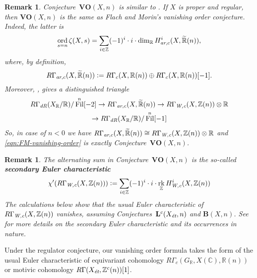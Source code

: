\documentclass[10pt,a4paper,oneside,draft]{article}
\DeclareMathOperator{\Fil}{Fil}
\DeclareMathOperator{\ord}{ord}
\DeclareMathOperator{\rk}{rk}
\newcommand{\CC}{\mathbb{C}}
\newcommand{\RR}{\mathbb{R}}
\newcommand{\ZZ}{\mathbb{Z}}
\newcommand{\ar}{\text{\it ar}}
\newcommand{\dR}{\text{\it dR}}
\newcommand{\et}{\text{\it \'{e}t}}
\newcommand{\Wc}{\text{\it W,c}}
\newcommand{\dfn}{\mathrel{\mathop:}=}
\theoremstyle{myplain}
\theoremstyle{mydefinition}
\newtheorem{remark}[theorem]{Remark}
\numberwithin{equation}{section}
\begin{document}
\begin{remark}
  Conjecture~$\mathbf{VO} (X,n)$ is similar to
  \cite[Conjecture~5.11]{Flach-Morin-2018}. If $X$ is proper and regular, then
  $\mathbf{VO} (X,n)$ is the same as Flach and Morin's vanishing order
  conjecture. Indeed, the latter is
  \begin{equation}
    \label{eqn:FM-vanishing-order}
    \ord_{s = n} \zeta (X,s) =
    \sum_{i\in \ZZ} (-1)^i \cdot i \cdot \dim_\RR H^i_{\ar,c} (X, \widetilde{\RR}(n)),
  \end{equation}
  where, by definition,
  \[ R\Gamma_{\ar,c} (X, \widetilde{\RR}(n)) \dfn
    R\Gamma_c (X, \RR(n)) \oplus R\Gamma_c (X, \RR(n)) [-1]. \]
  Moreover, \cite[Proposition 4.14]{Flach-Morin-2018}, gives a distinguished
  triangle
  \begin{multline*}
    R\Gamma_\dR (X_\RR/\RR) / \Fil^n [-2] \to
    R\Gamma_{\ar,c} (X, \widetilde{\RR}(n)) \to
    R\Gamma_\Wc (X, \ZZ(n)) \otimes \RR \\
    \to R\Gamma_\dR (X_\RR/\RR) / \Fil^n [-1]
  \end{multline*}
  So, in case of $n < 0$ we have
  $R\Gamma_{\ar,c} (X, \widetilde{\RR}(n)) \cong
  R\Gamma_\Wc (X, \ZZ(n)) \otimes \RR$ and
  \eqref{eqn:FM-vanishing-order} is exactly Conjecture~$\mathbf{VO} (X,n)$.
\end{remark}

\begin{remark}
  The alternating sum in Conjecture~$\mathbf{VO} (X,n)$ is the so-called
  \textbf{secondary Euler characteristic}
  \[ \chi' (R\Gamma_\Wc (X, \ZZ (n))) \dfn
    \sum_{i \in \ZZ} (-1)^i \cdot i \cdot \rk_\ZZ H^i_\Wc (X, \ZZ (n)) \]
  The calculations below show that the usual Euler characteristic of
  $R\Gamma_\Wc (X, \ZZ (n))$ vanishes, assuming
  Conjectures~$\mathbf{L}^c (X_\et,n)$ and $\mathbf{B} (X,n)$.  See
  \cite{Ramachandran-2016} for more details on the secondary Euler
  characteristic and its occurrences in nature.
\end{remark}

Under the regulator conjecture, our vanishing order formula takes the form of
the usual Euler characteristic of equivariant cohomology
$R\Gamma_c (G_\RR, X(\CC), \RR (n))$ or motivic cohomology
$R\Gamma (X_\et, \ZZ^c (n)) [1]$.
\end{document}
